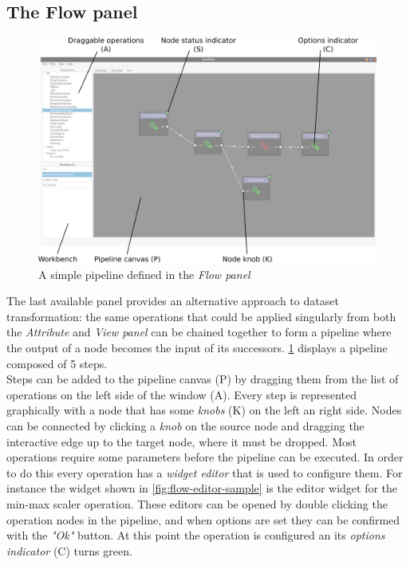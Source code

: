 \subsection{The Flow panel}\label{ssec:flow-panel-man}
\begin{figure}
	\centering
	\includegraphics[width=\textwidth]{flow-panel}
	\caption{A simple pipeline defined in the \textit{Flow panel}}
	\label{fig:flow-pipeline}
\end{figure}
The last available panel provides an alternative approach to dataset transformation: the same operations that could be applied singularly from both the \textit{Attribute} and \textit{View panel} can be chained together to form a pipeline where the output of a node becomes the input of its successors. \cref{fig:flow-pipeline} displays a pipeline composed of 5 steps.\\
Steps can be added to the pipeline canvas (P) by dragging them from the list of operations on the left side of the window (A). Every step is represented graphically with a node that has some \textit{knobs} (K) on the left an right side. Nodes can be connected by clicking a \textit{knob} on the source node and dragging the interactive edge up to the target node, where it must be dropped. Most operations require some parameters before the pipeline can be executed. In order to do this every operation has a \textit{widget editor} that is used to configure them. For instance the widget shown in \cref{fig:flow-editor-sample} is the editor widget for the min-max scaler operation. These editors can be opened by double clicking the operation nodes in the pipeline, and when options are set they can be confirmed with the \textit{"Ok"} button. At this point the operation is configured an its \textit{options indicator} (C) turns green.\\
